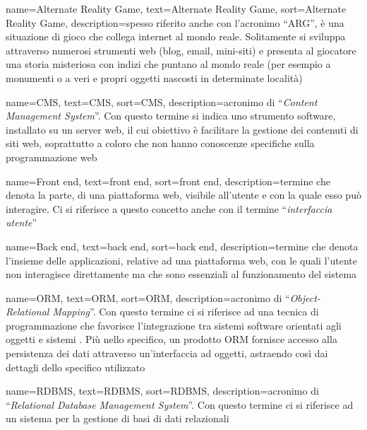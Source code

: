 {
    name=Alternate Reality Game, %
    text=Alternate Reality Game, %
    sort=Alternate Reality Game,
    description={spesso riferito anche con l’acronimo “ARG”, è una situazione di gioco che collega internet al mondo reale. Solitamente si sviluppa attraverso numerosi strumenti web (blog, email, mini-siti) e presenta al giocatore una storia misteriosa con indizi che puntano al mondo reale (per esempio a monumenti o a veri e propri oggetti nascosti in determinate località)}
}

{
    name=CMS, %
    text=CMS, %
    sort=CMS,
    description={acronimo di “\emph{Content Management System}”. Con questo termine si indica uno strumento software, installato su un server web, il cui obiettivo è facilitare la gestione dei contenuti di siti web, soprattutto a coloro che non hanno conoscenze specifiche sulla programmazione web}
}

{
    name=Front end, %
    text=front end, %
    sort=front end,
    description={termine che denota la parte, di una piattaforma web, visibile all'utente e con la quale esso può interagire. Ci si riferisce a questo concetto anche con il termine “\emph{interfaccia utente}”}
}

{
    name=Back end, %
    text=back end, %
    sort=back end,
    description={termine che denota l'insieme delle applicazioni, relative ad una piattaforma web, con le quali l'utente non interagisce direttamente ma che sono essenziali al funzionamento del sistema}
}

{
    name=ORM, %
    text=ORM, %
    sort=ORM,
    description={acronimo di “\emph{Object-Relational Mapping}”. Con questo termine ci si riferisce ad una tecnica di programmazione che favorisce l'integrazione tra sistemi software orientati agli oggetti e sistemi . Più nello specifico, un prodotto ORM fornisce accesso alla persistenza dei dati attraverso un'interfaccia ad oggetti, astraendo così dai dettagli dello specifico  utilizzato}
}

{
    name=RDBMS, %
    text=RDBMS, %
    sort=RDBMS,
    description={acronimo di “\emph{Relational Database Management System}”. Con questo termine ci si riferisce ad un sistema per la gestione di basi di dati relazionali}
}




